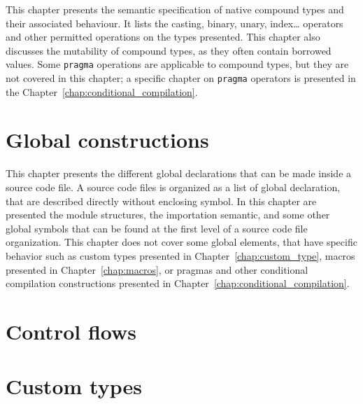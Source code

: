 \documentclass[a4paper,11pt]{book}
\begin{document}
This chapter presents the semantic specification of native compound types and
their associated behaviour. It lists the casting, binary, unary, index\ldots
operators and other permitted operations on the types presented. This chapter
also discusses the mutability of compound types, as they often contain borrowed
values. Some \texttt{pragma} operations are applicable to compound types, but
they are not covered in this chapter; a specific chapter on \texttt{pragma}
operators is presented in the Chapter~\ref{chap:conditional_compilation}.

\begin{multicols*}{2}
  \minitoc%
  
\end{multicols*}

\chapter{Global constructions}%
\label{chap:global_construction}

This chapter presents the different global declarations that can be made inside
a source code file. A source code files is organized as a list of global
declaration, that are described directly without enclosing symbol. In this
chapter are presented the module structures, the importation semantic, and some
other global symbols that can be found at the first level of a source code file
organization. This chapter does not cover some global elements, that have
specific behavior such as custom types presented in
Chapter~\ref{chap:custom_type}, macros presented in Chapter~\ref{chap:macros},
or pragmas and other conditional compilation constructions presented in
Chapter~\ref{chap:conditional_compilation}.

\begin{multicols*}{2}
  \minitoc%
  
\end{multicols*}

\chapter{Control flows}%
\label{chap:control_flows}

\begin{multicols*}{2}
  \minitoc%
\end{multicols*}%
\begin{multicols*}{2}
  
\end{multicols*}

\chapter{Custom types}%
\label{chap:custom_types}


\begin{multicols*}{2}
  \minitoc%
\end{multicols*}%
\begin{multicols*}{2}
  
\end{multicols*}
\end{document}
